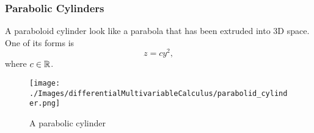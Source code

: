 \subsubsection{Parabolic Cylinders}
\noindent
A paraboloid cylinder look like a parabola that has been extruded into 3D space. One of its forms is
\begin{equation*}
	z = cy^2,	
\end{equation*} 
where $c \in \mathbb{R}$.

\begin{figure}[H]
	\centering
	\texttt{[image: ./Images/differentialMultivariableCalculus/parabolid\_cylinder.png]}
	\caption{A parabolic cylinder}
\end{figure}